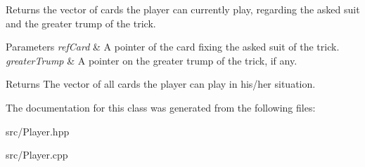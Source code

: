 Returns the vector of cards the player can currently play, regarding the asked suit and the greater trump of the trick. 


\begin{DoxyParams}{Parameters}
{\em ref\-Card} & A pointer of the card fixing the asked suit of the trick. \\
\hline
{\em greater\-Trump} & A pointer on the greater trump of the trick, if any. \\
\hline
\end{DoxyParams}
\begin{DoxyReturn}{Returns}
The vector of all cards the player can play in his/her situation. 
\end{DoxyReturn}


The documentation for this class was generated from the following files\-:\begin{DoxyCompactItemize}
\item 
src/Player.\-hpp\item 
src/Player.\-cpp\end{DoxyCompactItemize}
